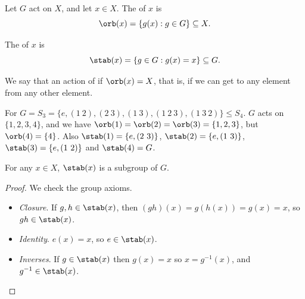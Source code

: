 \documentclass[a4]{scrreprt}
\begin{document}
\begin{center}
	

\end{center}

\begin{definition}[Orbit]
Let $G$ act on $X$, and let $x \in X$. The  of $x$ is
$$
	\orb(x) = \{ g(x) : g \in G \} \subseteq X.
$$
\end{definition}

\begin{definition}[Stabilizer]
The  of $x$ is
$$
\stab(x) = \{ g \in G : g(x) = x \} \subseteq G.
$$
\end{definition}

We say that an action of  if $\orb(x) = X$, that is, if we can get to any element from any other element.

\begin{example}
	For $G = S_3 = \{e, (1\ 2), (2\ 3), (1\ 3), (1\ 2\ 3), (1\ 3\ 2)\} \leq S_4$. $G$ acts on $\{1, 2, 3, 4\}$, and we have $\orb(1) = \orb(2) = \orb(3) =\{1, 2, 3\}$, but $\orb(4) = \{4\}$. Also $\stab(1) = \{e, (2\ 3)\}$, $\stab(2) = \{ e, (1\ 3)\}$, $\stab(3) = \{ e, (1\ 2)\}$ and $\stab(4) = G$.
\end{example}

\begin{lemma}
	For any $x \in X$, $\stab(x)$ is a subgroup of $G$.
\end{lemma}
\begin{proof}
	We check the group axioms.
	\begin{itemize}
		\item \emph{Closure}. If $g, h \in \stab(x)$, then $(gh)(x) = g(h(x)) = g(x) = x$, so $gh \in \stab(x)$.
		\item \emph{Identity}. $e(x) = x$, so $e \in \stab(x)$.
		\item \emph{Inverses}. If $g \in \stab(x)$ then $g(x) = x$ so $x = g^{-1}(x)$, and $g^{-1} \in \stab(x)$.
	\end{itemize}
\end{proof}
\end{document}
